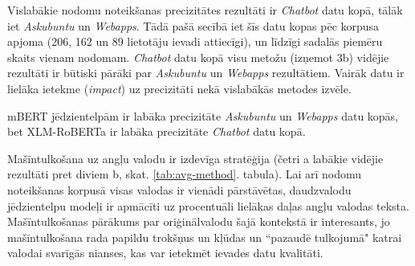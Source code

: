 






Vislabākie nodomu noteikšanas precizitātes rezultāti ir \textit{Chatbot} datu kopā, tālāk iet \textit{Askubuntu} un \textit{Webapps}. Tādā pašā secībā iet šīs datu kopas pēc korpusa apjoma (206, 162 un 89 lietotāju ievadi attiecīgi), un līdzīgi sadalās piemēru skaits vienam nodomam. \textit{Chatbot} datu kopā visu metožu (izņemot 3b) vidējie rezultāti ir būtiski pārāki par \textit{Askubuntu} un \textit{Webapps} rezultātiem. Vairāk datu ir lielāka ietekme (\textit{impact}) uz precizitāti nekā vislabākās metodes izvēle.

mBERT jēdzientelpām ir labāka precizitāte \textit{Askubuntu} un \textit{Webapps} datu kopās, bet XLM-RoBERTa ir labāka precizitāte \textit{Chatbot} datu kopā.

Mašīntulkošana uz angļu valodu ir izdevīga stratēģija (četri a labākie vidējie rezultāti pret diviem b, skat. \ref{tab:avg-method}. tabula). Lai arī nodomu noteikšanas korpusā visas valodas ir vienādi pārstāvētas, daudzvalodu jēdzientelpu modeļi ir apmācīti uz procentuāli lielākas daļas angļu valodas teksta. Mašīntulkošanas pārākums par oriģinālvalodu šajā kontekstā ir interesants, jo mašīntulkošana rada papildu trokšņus un kļūdas un ``pazaudē tulkojumā" katrai valodai svarīgās nianses, kas var ietekmēt ievades datu kvalitāti.

